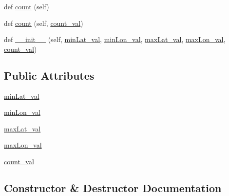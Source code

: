 \begin{DoxyCompactItemize}
\item 
def \hyperlink{classbridges_1_1data__src__dependent_1_1amenity_1_1meta_aac486d345e9fb60211c9e741cc7e0f9e}{count} (self)
\item 
def \hyperlink{classbridges_1_1data__src__dependent_1_1amenity_1_1meta_ae9175370e8a4b0162dccc0c3fc11ebab}{count} (self, \hyperlink{classbridges_1_1data__src__dependent_1_1amenity_1_1meta_a961c10a7c226b82f0b8573fa8f4b1e63}{count\+\_\+val})
\item 
def \hyperlink{classbridges_1_1data__src__dependent_1_1amenity_1_1meta_a5af918b7b6c6bb22f01376c96953778a}{\+\_\+\+\_\+init\+\_\+\+\_\+} (self, \hyperlink{classbridges_1_1data__src__dependent_1_1amenity_1_1meta_a7d6af8fd22fd3a1b8e03077926229406}{min\+Lat\+\_\+val}, \hyperlink{classbridges_1_1data__src__dependent_1_1amenity_1_1meta_a9d488c9a1f02cc38f88238968ddd44a9}{min\+Lon\+\_\+val}, \hyperlink{classbridges_1_1data__src__dependent_1_1amenity_1_1meta_a17455ecd1b0fba7cebf9fadde1b42bf4}{max\+Lat\+\_\+val}, \hyperlink{classbridges_1_1data__src__dependent_1_1amenity_1_1meta_a90cf7fb57017cb6df689857e0a8a515f}{max\+Lon\+\_\+val}, \hyperlink{classbridges_1_1data__src__dependent_1_1amenity_1_1meta_a961c10a7c226b82f0b8573fa8f4b1e63}{count\+\_\+val})
\end{DoxyCompactItemize}
\subsection*{Public Attributes}
\begin{DoxyCompactItemize}
\item 
\hyperlink{classbridges_1_1data__src__dependent_1_1amenity_1_1meta_a7d6af8fd22fd3a1b8e03077926229406}{min\+Lat\+\_\+val}
\item 
\hyperlink{classbridges_1_1data__src__dependent_1_1amenity_1_1meta_a9d488c9a1f02cc38f88238968ddd44a9}{min\+Lon\+\_\+val}
\item 
\hyperlink{classbridges_1_1data__src__dependent_1_1amenity_1_1meta_a17455ecd1b0fba7cebf9fadde1b42bf4}{max\+Lat\+\_\+val}
\item 
\hyperlink{classbridges_1_1data__src__dependent_1_1amenity_1_1meta_a90cf7fb57017cb6df689857e0a8a515f}{max\+Lon\+\_\+val}
\item 
\hyperlink{classbridges_1_1data__src__dependent_1_1amenity_1_1meta_a961c10a7c226b82f0b8573fa8f4b1e63}{count\+\_\+val}
\end{DoxyCompactItemize}


\subsection{Constructor \& Destructor Documentation}
\mbox{\label{classbridges_1_1data__src__dependent_1_1amenity_1_1meta_a5af918b7b6c6bb22f01376c96953778a}} 

